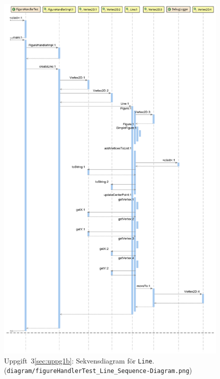 \begin{figure}[ht]
\centering
\includegraphics[width=0.8\linewidth]{diagram/figureHandlerTest_Line_Sequence-Diagram.png}
\caption{Uppgift~3\ref{sec:uppg1b}: Sekvensdiagram för \texttt{Line}.
\\ (\texttt{diagram/figureHandlerTest\_Line\_Sequence-Diagram.png})}
\label{fig:sekv-line}
\end{figure}

